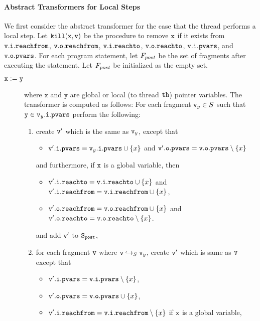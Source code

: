 \paragraph{Abstract Transformers for Local Steps} We first consider
the abstract transformer for the case that the thread performs a local
step.
Let $\tt kill(x,v)$ be the procedure to remove $\tt x$ if it exists from
$\mathtt{v}.\mathtt{i}.\mathtt{reachfrom}$,
$\mathtt{v}.\mathtt{o}.\mathtt{reachfrom}$,
$\mathtt{v}.\mathtt{i}.\mathtt{reachto}$,
$\mathtt{v}.\mathtt{o}.\mathtt{reachto}$,
$\mathtt{v}.\mathtt{i}.\mathtt{pvars}$, and
$\mathtt{v}.\mathtt{o}.\mathtt{pvars}$.
For each program statement, let $F_{post}$ be the set of fragments after executing the statement. Let $F_{post}$ be initialized as the empty set.
\begin{description}
\item[${\tt x := y}$] where $\mathtt{x}$ and $\mathtt{y}$ are global or local
  (to thread ${\tt th}$) pointer variables.
  The transformer is computed as follows: For each fragment $\mathtt{v}_y \in S$ such that $\mathtt{y} \in \mathtt{v}_y.\mathtt{i}.\mathtt{pvars}$ perform the following:
\begin{enumerate}
\item create $\mathtt{v}'$ which is the same as $\mathtt{v}_y$, except that
\begin{itemize}
\item $\mathtt{v}'.\mathtt{i}.\mathtt{pvars} = \mathtt{v}_y.\mathtt{i}.\mathtt{pvars} \cup \left\{x\right\}$ and
  $\mathtt{v}'.\mathtt{o}.\mathtt{pvars} = \mathtt{v}.\mathtt{o}.\mathtt{pvars} \setminus \left\{x\right\}$
\end{itemize}
and furthermore, if $\mathtt{x}$ is a global variable, then
\begin{itemize}
\item $\mathtt{v}'.\mathtt{i}.\mathtt{reachto} = \mathtt{v}.\mathtt{i}.\mathtt{reachto} \cup \left\{x\right\}$ and
$\mathtt{v}'.\mathtt{i}.\mathtt{reachfrom} = \mathtt{v}.\mathtt{i}.\mathtt{reachfrom} \cup \left\{x\right\}$,
\item $\mathtt{v}'.\mathtt{o}.\mathtt{reachfrom} = \mathtt{v}.\mathtt{o}.\mathtt{reachfrom} \cup \left\{x\right\}$ and
$\mathtt{v}'.\mathtt{o}.\mathtt{reachto} = \mathtt{v}.\mathtt{o}.\mathtt{reachto} \setminus \left\{x\right\}$.
\end{itemize}
and add $\mathtt{v}'$ to $\tt S_{post}$,
\item  for each fragment $\mathtt{v}$ where $\mathtt{v} \hookrightarrow_S \mathtt{v}_y$, create $\mathtt{v}'$ which is same as $\mathtt{v}$ except that
\begin{itemize}
\item $\mathtt{v}'.\mathtt{i}.\mathtt{pvars} = \mathtt{v}.\mathtt{i}.\mathtt{pvars} \setminus \left\{x\right\}$,
\item $\mathtt{v}'.\mathtt{o}.\mathtt{pvars} = \mathtt{v}.\mathtt{o}.\mathtt{pvars} \cup \left\{x\right\}$,
\item $\mathtt{v}'.\mathtt{i}.\mathtt{reachfrom} = \mathtt{v}.\mathtt{i}.\mathtt{reachfrom} \setminus \left\{x\right\}$ if $\tt x$ is a global variable,

\end{itemize}
\end{enumerate}
\end{description}
